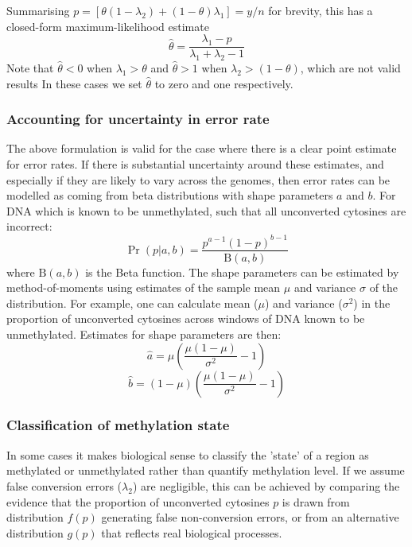 \documentclass[twocolumn,twoside,lettersize]{article}
\begin{document}
Summarising $p=[\theta(1-\lambda_2) + (1-\theta)\lambda_1] = y/n$ for brevity, this has a closed-form maximum-likelihood estimate
\begin{equation}
    \label{eqn:ml-theta}
    \hat{\theta} = \frac{\lambda_1-p}{\lambda_1 + \lambda_2 -1}
\end{equation}
Note that $\hat{\theta}<0$ when $\lambda_1 > \theta$ and $\hat{\theta}>1$ when $\lambda_2 > (1-\theta)$, which are not valid results
In these cases we set $\hat{\theta}$ to zero and one respectively.

\subsubsection{Accounting for uncertainty in error rate} \label{sec:mean-as-beta}

The above formulation is valid for the case where there is a clear point estimate for error rates.
If there is substantial uncertainty around these estimates, and especially if they are likely to vary across the genomes, then error rates can be modelled as coming from beta distributions with shape parameters $a$ and $b$. For DNA which is known to be unmethylated, such that all unconverted cytosines are incorrect:
\begin{equation}
    \label{eqn:beta-dist}
    \Pr(p|a,b) = \frac{p^{a-1} (1-p)^{b-1}}{\textrm{B}(a,b)}
\end{equation}
where $\textrm{B}(a,b)$ is the Beta function.
The shape parameters can be estimated by method-of-moments using estimates of the sample mean $\mu$ and variance $\sigma$ of the distribution.
For example, one can calculate mean ($\mu$) and variance ($\sigma^2$) in the proportion of unconverted cytosines across windows of DNA known to be unmethylated.
Estimates for shape parameters are then:
\begin{equation}
    \hat{a} = \mu(\frac{\mu(1-\mu)}{\sigma^2}-1)
    \label{eqn:beta-a}
\end{equation}
\begin{equation}
    \hat{b} = (1-\mu)(\frac{\mu(1-\mu)}{\sigma^2}-1) 
    \label{eqn:beta-b}
\end{equation}

\subsubsection{Classification of methylation state} \label{sec:meth-state}

In some cases it makes biological sense to classify the 'state' of a region as methylated or unmethylated rather than quantify methylation level.
If we assume false conversion errors ($\lambda_2$) are negligible, this can be achieved by comparing the evidence that the proportion of unconverted cytosines $p$ is drawn from distribution $f(p)$ generating false non-conversion errors, or from an alternative distribution $g(p)$ that reflects real biological processes.
\end{document}
